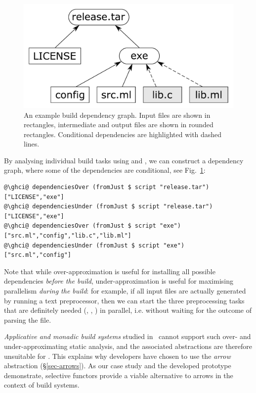 {\begin{figure}
\centerline{\includegraphics[scale=0.3]{fig/build-dependencies.pdf}}
\vspace{-2mm}
\caption{An example build dependency graph. Input files are shown in rectangles,
intermediate and output files are shown in rounded rectangles. Conditional
dependencies are highlighted with dashed lines.}
\label{fig-build}
\vspace{-4mm}
\end{figure}

By analysing individual build tasks using  and
, we can construct a dependency graph, where some of the
dependencies are conditional, see Fig.~\ref{fig-build}:

\vspace{1mm}
\begin{verbatim}
@\ghci@ dependenciesOver (fromJust $ script "release.tar")
["LICENSE","exe"]
@\ghci@ dependenciesUnder (fromJust $ script "release.tar")
["LICENSE","exe"]
@\ghci@ dependenciesOver (fromJust $ script "exe")
["src.ml","config","lib.c","lib.ml"]
@\ghci@ dependenciesUnder (fromJust $ script "exe")
["src.ml","config"]
\end{verbatim}
\vspace{1mm}

Note that while over-approximation is useful for installing all possible
dependencies \emph{before the build}, under-approximation is useful for
maximising parallelism \emph{during the build}: for example, if all input files
are actually generated by running a text preprocessor, then we can start the
three preprocessing tasks that are definitely needed (,
, ) in parallel, i.e. without waiting for the outcome of
parsing the  file.

\emph{Applicative and monadic build systems} studied in~\citep{mokhov2018build}
cannot support such over- and under-approximating static analysis, and the
associated abstractions are therefore unsuitable for \Dune. This explains why
\Dune developers have chosen to use the \emph{arrow} abstraction
(\S\ref{sec-arrows}). As our case study and the developed prototype demonstrate,
selective functors provide a viable alternative to arrows in the context of
build systems.

}
